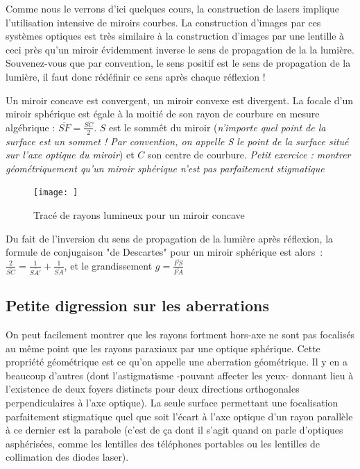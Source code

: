 \documentclass[a4paper]{book}
\begin{document}
Comme nous le verrons d'ici quelques cours, la construction de lasers implique l'utilisation intensive de miroirs courbes. La construction d'images par ces systèmes optiques est très similaire à la construction d'images par une lentille à ceci près qu'un miroir évidemment inverse le sens de propagation de la la lumière. Souvenez-vous que par convention, le sens positif est le sens de propagation de la lumière, il faut donc rédéfinir ce sens après chaque réflexion ! 

Un miroir concave est convergent, un miroir convexe est divergent. La focale d'un miroir sphérique est égale à la moitié de son rayon de courbure en mesure algébrique : $\overline{SF}=\frac{\overline{SC}}{2}$. $S$ est le sommêt du miroir (\textit{n'importe quel point de la surface est un sommet ! Par convention, on appelle S le point de la surface situé sur l'axe optique du miroir}) et $C$ son centre de courbure.
\textit{Petit exercice : montrer géométriquement qu'un miroir sphérique n'est pas parfaitement stigmatique}
\begin{figure}[!htbp]
\label{fig:miroir_concave}
\begin{center}
\texttt{[image: ]}
\end{center}
\caption{Tracé de rayons lumineux pour un miroir concave}
\end{figure}

Du fait de l'inversion du sens de propagation de la lumière après réflexion, la formule de conjugaison "de Descartes" pour un miroir sphérique est alors~: $\frac{2}{\overline{SC}}=\frac{1}{\overline{SA'}}+\frac{1}{\overline{SA}}$, et le grandissement $g = \frac{\overline{FS}}{\overline{FA}}$

\subsection{Petite digression sur les aberrations}

On peut facilement montrer que les rayons fortment hors-axe ne sont pas focalisés au même point que les rayons paraxiaux par une optique sphérique. Cette propriété géométrique est ce qu'on appelle une aberration géométrique. Il y en a beaucoup d'autres (dont l'astigmatisme -pouvant affecter les yeux- donnant lieu à l'existence de deux foyers distincts pour deux directions orthogonales perpendiculaires à l'axe optique). La seule surface permettant une focalisation parfaitement stigmatique quel que soit l'écart à l'axe optique d'un rayon parallèle à ce dernier est la parabole (c'est de ça dont il s'agit quand on parle d'optiques asphérisées, comme les lentilles des téléphones portables ou les lentilles de collimation des diodes laser).
\end{document}
